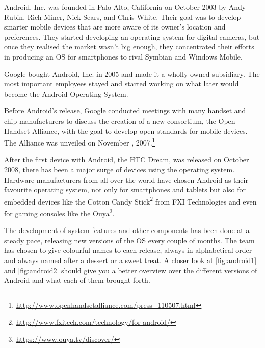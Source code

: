 Android, Inc. was founded in Palo Alto, California on October 2003 by Andy Rubin, Rich Miner, Nick Sears, and Chris White. Their goal was to develop smarter mobile devices that are more aware of its owner's location and preferences. They started developing an operating system for digital cameras, but once they realised the market wasn't big enough, they concentrated their efforts in producing an \ac{OS} for smartphones to rival Symbian and Windows Mobile.\cite{wikipedia:android}

Google bought Android, Inc. in 2005 and made it a wholly owned subsidiary. The most important employees stayed and started working on what later would become the Android Operating System.

Before Android's release, Google conducted meetings with many handset and chip manufacturers to discuss the creation of a new consortium, the Open Handset Alliance, with the goal to develop open standards for mobile devices. The Alliance was unveiled on November , 2007.\footnote{\url{http://www.openhandsetalliance.com/press_110507.html}}


After the first device with Android, the HTC Dream, was released on October 2008, there has been a major surge of devices using the operating system. Hardware manufacturers from all over the world have chosen Android as their favourite operating system, not only for smartphones and tablets but also for embedded devices like the Cotton Candy Stick\footnote{\url{http://www.fxitech.com/technology/for-android/}} from FXI Technologies and even for gaming consoles like the Ouya\footnote{\url{https://www.ouya.tv/discover/}}. %


The development of system features and other components has been done at a steady pace, releasing new versions of the \ac{OS} every couple of months. The team has chosen to give colourful names to each release, always in alphabetical order and always named after a dessert or a sweet treat. A closer look at \autoref{fig:android1} and \autoref{fig:android2} should give you a better overview over the different versions of Android and what each of them brought forth.   

